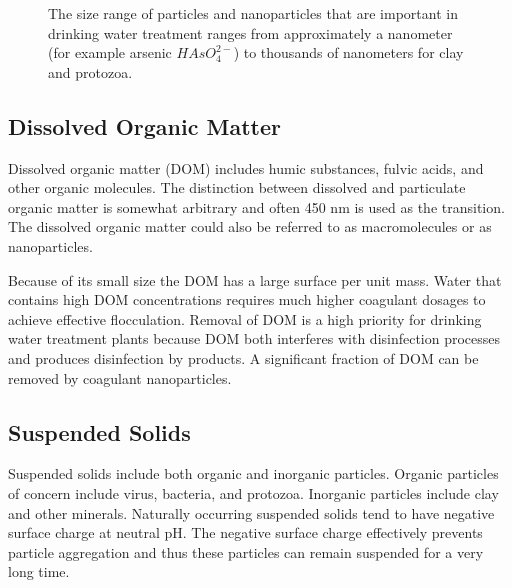 \documentclass[letterpaper,10pt,english]{sphinxmanual}
\let\sphinxpxdimen\pdfpxdimen\else\newdimen\sphinxpxdimen
\begin{document}
\begin{figure}[htbp]
\centering
\capstart

\noindent\sphinxincludegraphics[width=400\sphinxpxdimen]{{Particle_sizes}.png}
\caption{The size range of particles and nanoparticles that are important in drinking water treatment ranges from approximately a nanometer (for example arsenic \(HAsO_4^{2-}\)) to thousands of nanometers for clay and protozoa.}\label{\detokenize{Rapid_Mix/RM_Intro:id10}}\label{\detokenize{Rapid_Mix/RM_Intro:figure-particle-sizes}}\end{figure}


\subsection{Dissolved Organic Matter}
\label{\detokenize{Rapid_Mix/RM_Intro:dissolved-organic-matter}}\label{\detokenize{Rapid_Mix/RM_Intro:heading-dissolved-organic-matter-and-coagulant}}
Dissolved organic matter (DOM) includes humic substances, fulvic acids, and other organic molecules. The distinction between dissolved and particulate organic matter is somewhat arbitrary and often 450 nm is used as the transition.  The dissolved organic matter could also be referred to as macromolecules or as nanoparticles.

Because of its small size the DOM has a large surface per unit mass. Water that contains high DOM concentrations requires much higher coagulant dosages to achieve effective flocculation. Removal of DOM is a high priority for drinking water treatment plants because DOM both interferes with disinfection processes and produces disinfection by products. A significant fraction of DOM can be removed by coagulant nanoparticles.


\subsection{Suspended Solids}
\label{\detokenize{Rapid_Mix/RM_Intro:suspended-solids}}\label{\detokenize{Rapid_Mix/RM_Intro:heading-suspended-solids-and-coagulant}}
Suspended solids include both organic and inorganic particles. Organic particles of concern include virus, bacteria, and protozoa. Inorganic particles include clay and other minerals. Naturally occurring suspended solids tend to have negative surface charge at neutral pH. The negative surface charge effectively prevents particle aggregation and thus these particles can remain suspended for a very long time.
\end{document}
